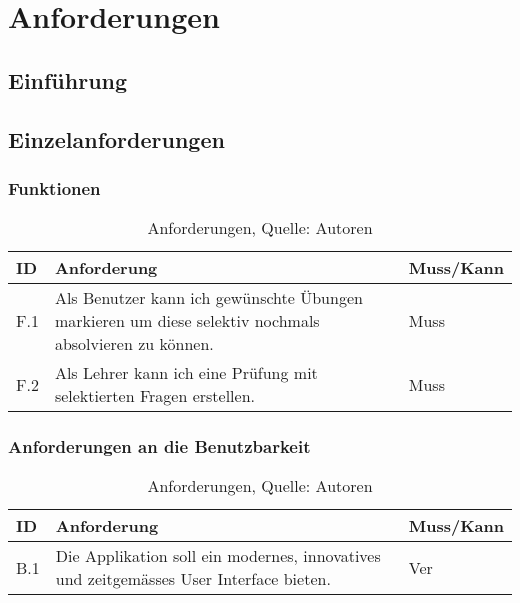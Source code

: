 \section{Anforderungen}\label{Anforderungen}
\subsection{Einführung}

\subsection{Einzelanforderungen}
\subsubsection{Funktionen}
\begin{table}[H]
    \setlength\extrarowheight{2pt} %
    \begin{tabularx}{\textwidth}{|l|X|l|}
        \hline
        \textbf{ID} &  \textbf{Anforderung} & \textbf{Muss/Kann}  \\
        \hline
        F.1 & Als Benutzer kann ich gewünschte Übungen markieren um diese selektiv nochmals absolvieren zu können. & Muss \\
        \hline
        F.2 & Als Lehrer kann ich eine Prüfung mit selektierten Fragen erstellen. & Muss \\
        \hline
    \end{tabularx}
    \caption{ \label{tbl: Funktionsanforderungen}Anforderungen, Quelle: Autoren}
\end{table}
\subsubsection{Anforderungen an die Benutzbarkeit}
\begin{table}[H]
    \setlength\extrarowheight{2pt} %
    \begin{tabularx}{\textwidth}{|l|X|l|}
        \hline
        \textbf{ID} &  \textbf{Anforderung} & \textbf{Muss/Kann}  \\
        \hline
        B.1 & Die Applikation soll ein modernes, innovatives und zeitgemässes User Interface bieten. & Ver \\
        \hline
    \end{tabularx}
    \caption{ \label{tbl: Anforderungen an die Benutzbarkeit}Anforderungen, Quelle: Autoren}
\end{table}
